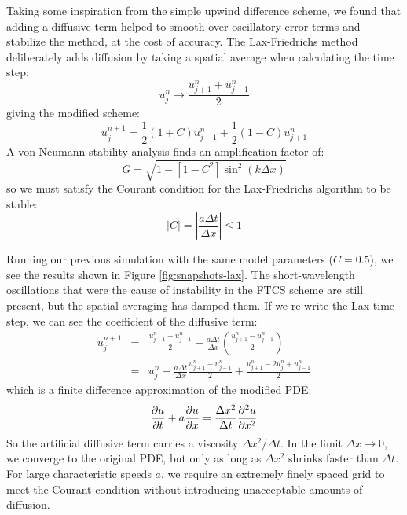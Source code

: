 \documentclass[%
 reprint,
 amsmath,amssymb,
 aps,
]{revtex4-2}
\begin{document}
Taking some inspiration from the simple upwind difference scheme, we found that adding a diffusive term helped to smooth over oscillatory error terms and stabilize the method, at the cost of accuracy. The Lax-Friedrichs method deliberately adds diffusion by taking a spatial average when calculating the time step:
\begin{equation}
u_j ^n \rightarrow \frac{u_{j+1} ^n + u_{j-1} ^n}{2}
\end{equation}
giving the modified scheme:
\begin{equation}
u_j ^{n+1} = \frac{1}{2} (1 + C) u_{j-1} ^n + \frac{1}{2} (1 - C) u_{j+1} ^n
\end{equation}
A von Neumann stability analysis finds an amplification factor of:
\begin{equation}
G = \sqrt{1 - \left[ 1 - C^2 \right] \sin ^2 ( k \Delta x)}
\end{equation}
so we must satisfy the Courant condition for the Lax-Friedrichs algorithm to be stable:
\begin{equation}
|C| = \left| \frac{a \Delta t}{\Delta x} \right| \leq 1 
\end{equation}

Running our previous simulation with the same model parameters ($C = 0.5$), we see the results shown in Figure \ref{fig:snapshots-lax}. The short-wavelength oscillations that were the cause of instability in the FTCS scheme are still present, but the spatial averaging has damped them. If we re-write the Lax time step, we can see the coefficient of the diffusive term:
\begin{eqnarray*}
u_j ^{n+1} & = & \frac{u_{j+1} ^n + u_{j-1} ^n}{2} - \frac{a \Delta t}{\Delta x} \left( \frac{u_{j+1} ^n - u_{j - 1} ^n}{2} \right) \\
& = & u_j ^n - \frac{a \Delta t}{\Delta x} \frac{u_{j+1} ^n - u_{j - 1} ^n}{2} + \frac{u_{j+1} ^n - 2 u_j ^n + u_{j-1} ^n}{2}
\end{eqnarray*}
which is a finite difference approximation of the modified PDE:
\begin{equation}
\pdv{u}{t} + a \pdv{u}{x} = \frac{\Delta x ^2}{\Delta t} \pdv{^2 u}{x ^2}
\end{equation}
So the artificial diffusive term carries a viscosity $\Delta x ^2 / \Delta t$. In the limit $\Delta x \rightarrow 0$, we converge to the original PDE, but only as long as $\Delta x ^2$ shrinks faster than $\Delta t$. For large characteristic speeds $a$, we require an extremely finely spaced grid to meet the Courant condition without introducing unacceptable amounts of diffusion.
\end{document}
